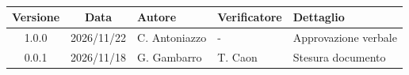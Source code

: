 \\[0.5cm]

\renewcommand{\arraystretch}{1.3}
\noindent\begin{tabularx}{\textwidth}{|c|c|>{\raggedright\arraybackslash}p{2.8cm}|>{\raggedright\arraybackslash}p{2.8cm}|X|}
    \hline
    \textbf{Versione} & \textbf{Data} & \textbf{Autore} & \textbf{Verificatore} & \textbf{Dettaglio} \\
    \hline
    1.0.0 & 2026/11/22 & C. Antoniazzo & - & Approvazione verbale \\
    \hline
    0.0.1 & 2026/11/18 & G. Gambarro & T. Caon & Stesura documento \\
    \hline
\end{tabularx}
\newpage

